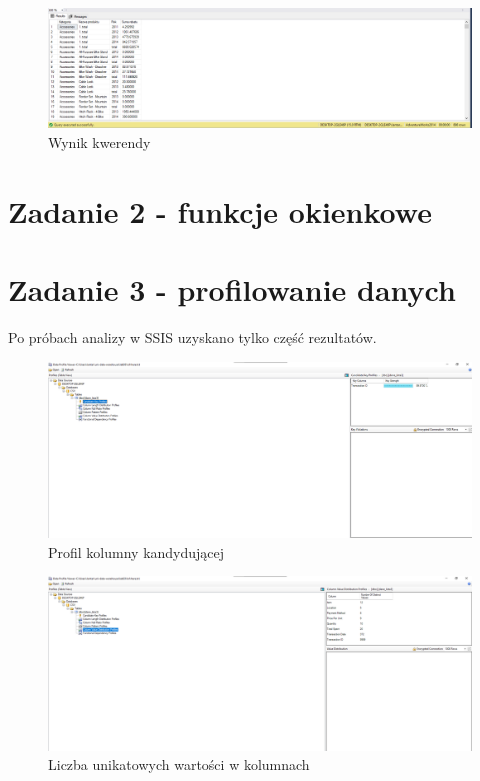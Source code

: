 \documentclass[a4paper,12pt]{article}
\begin{document}
\begin{figure}[H]
  \centering
  \includegraphics[width=1.0\textwidth]{images/1.2.png}
  \caption{Wynik kwerendy}
\end{figure}

\section{Zadanie 2 - funkcje okienkowe}

\section{Zadanie 3 - profilowanie danych}

Po próbach analizy w SSIS uzyskano tylko część rezultatów.

\begin{figure}[H]
  \centering
  \includegraphics[width=1.0\textwidth]{images/ssis_1.png}
  \caption{Profil kolumny kandydującej}
\end{figure}

\begin{figure}[H]
  \centering
  \includegraphics[width=1.0\textwidth]{images/ssis_2.png}
  \caption{Liczba unikatowych wartości w kolumnach}
\end{figure}
\end{document}
